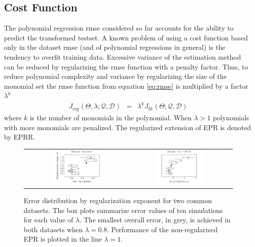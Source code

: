 \documentclass[times,review,preprint]{elsarticle}
\begin{document}
\subsection{Cost Function}\label{subs:cost.function}

The polynomial regression \ac{rmse} considered so far accounts for the ability to predict the transformed testset. A known problem of using a cost function based only in the dataset \ac{rmse} (and of polynomial regressions in general) is the tendency to overfit  training data. Excessive variance of the estimation method can be reduced by regularizing the \ac{rmse} function with a penalty factor. Thus, to reduce polynomial complexity and variance by regularizing the size of the monomial set the \ac{rmse} function from equation \ref{eq:rmse} is multiplied by a factor $\lambda^{k}$
\begin{eqnarray}
J_{\textrm{reg}}\left(\Theta, \lambda;\mathcal{Q},\mathcal{D}\right) &=& \lambda^{k} J_{\textrm{fit}}\left(\Theta;\mathcal{Q},\mathcal{D}\right)\label{eq:rmse-reg}
\end{eqnarray}
%
where $k$ is the number of monomials in the polynomial. When $\lambda > 1$ polynomials with more monomials are penalized. The regularized extension of \ac{EPR} is denoted by \acf{EPRR}. 

\begin{figure}[tb]\begin{center}
\begin{tabular}{cc}
\includegraphics[width=0.49\textwidth]{figure_1a.pdf}
%
&
%
%
\includegraphics[width=0.49\textwidth]{figure_1b.pdf}
\end{tabular}

\caption{Error distribution by regularization exponent for two common datasets. The box plots summarize error values of ten simulations for each value of $\lambda$. The smallest overall error, in grey, is achieved in both datasets when $\lambda=0.8$. Performance of the non-regularized \ac{EPR} is plotted in the line $\lambda = 1$.}
\label{fig:lambda.error-distribution}\label{Abalone_dataset_lambdas}\label{Auto-MPG_dataset_lambdas}

\end{center}\end{figure}
\end{document}
